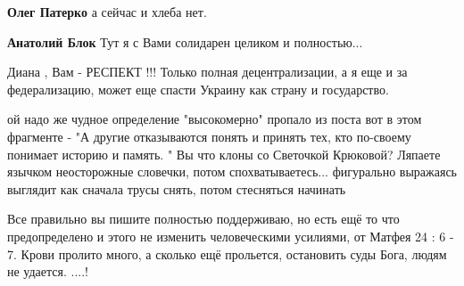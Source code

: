 \begin{itemize}
\begin{itemize}
 
\textbf{Олег Патерко} а сейчас и хлеба нет.

 
\textbf{Анатолий Блок} Тут я с Вами солидарен целиком и полностью...
\end{itemize}

 
Диана , Вам - РЕСПЕКТ !!! Только полная децентрализации, а я еще и за федерализацию, может еще спасти Украину как страну и государство.

 

ой надо же чудное определение "высокомерно" пропало из поста вот в этом
фрагменте - "А другие отказываются понять и принять тех, кто по-своему понимает
историю и память. " Вы что клоны со Светочкой Крюковой? Ляпаете язычком
неосторожные словечки, потом спохватываетесь... фигурально выражаясь выглядит
как сначала трусы снять, потом стесняться начинать


 

Все правильно вы пишите полностью поддерживаю, но есть ещё то что предопределено и этого не изменить человеческими усилиями, от Матфея 24 : 6 - 7. Крови пролито много,
а сколько ещё прольется,
остановить суды Бога,
людям не удается. ....!


\end{itemize}
